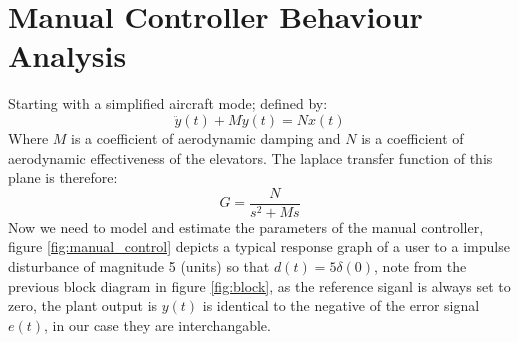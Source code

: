 \documentclass{article}
\begin{document}
\section{Manual Controller Behaviour Analysis}
Starting with a simplified aircraft mode; defined by:
\begin{equation}
	\ddot{y}(t)+M\dot{y}(t)=Nx(t)
\end{equation}
Where $M$ is a coefficient of aerodynamic damping and $N$ is a coefficient of aerodynamic effectiveness of the elevators. The laplace transfer function of this plane is therefore:
\begin{equation}
	G = \dfrac{N}{s^2+Ms}
\end{equation}
Now we need to model and estimate the parameters of the manual controller, figure \ref{fig:manual_control} depicts a typical response graph of a user to a impulse disturbance of magnitude 5 (units) so that $d(t)=5\delta(0)$, note from the previous block diagram in figure \ref{fig:block}, as the reference siganl is always set to zero, the plant output is $y(t)$ is identical to the negative of the error signal $e(t)$, in our case they are interchangable.
\end{document}
